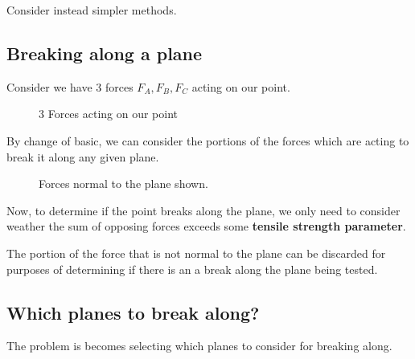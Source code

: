 \documentclass{article}
\begin{document}
Consider instead simpler methods.

\subsection{Breaking along a plane}


Consider we have 3 forces $F_A,F_B, F_C$ acting on our point.
\newcommand{\diagramsetup}{	\node (core) [draw, circle]  {};
	\node(A) [brown]  at (-3,1)  {$F_A$};
	\node(B) [brown]  at (2.5,0.5)  {$F_B$};
	\node(C) [brown]  at (-2,-2)  {$F_C$};
	
	\coordinate (p1) at (1.4,-2);
	\coordinate (p2) at ($-1*(p1)$);
}

\begin{figure}[H]
	\center
	\caption{3 Forces acting on our point}
\end{figure}

By change of basic, we can consider the portions of the forces which are acting to break it along any given plane.

\begin{figure}[H]
	\center
	\caption{Forces normal to the plane shown.}
\end{figure}

Now, to determine if the point breaks along the plane, we only need to consider weather the sum of opposing forces exceeds some \textbf{tensile strength parameter}.

The portion of the force that is not normal to the plane can be discarded for purposes of determining if there is an a break along the plane being tested.

\subsection{Which planes to break along?}
The problem is becomes selecting which planes to consider for breaking along.
\end{document}
